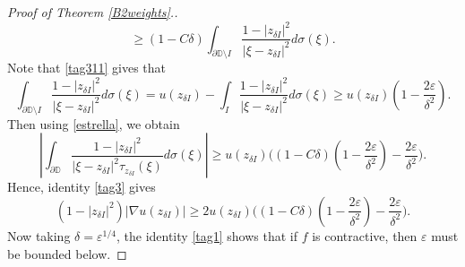 \documentclass[a4paper,12pt]{article}
\theoremstyle{definition}
\numberwithin{equation}{section}
\newcommand{\D}{\mathbb D}
\begin{document}
\begin{proof}[Proof of Theorem \ref{B2weights}.]
$$ \geqslant(1- C\delta) \int_{\partial \D \setminus I} \frac{1- |z_{\delta I}|^{2}}{\left|\xi -z_{\delta I}\right|^{2}} d \sigma(\xi) . 
$$
Note that \eqref{tag311} gives that
$$
\int_{\partial \D \setminus I} \frac{1- |z_{\delta I}|^{2}}{\left|\xi -z_{\delta I}\right|^{2}} d \sigma(\xi) = u\left(z_{\delta I}\right)-\int_{I} \frac{1-\left|z_{\delta I}\right|^{2}}{\left|\xi -z_{\delta I}\right|^{2}} d \sigma (\xi)   \geqslant u\left(z_{\delta I}\right)\left( 1 -\frac{2 \varepsilon}{\delta^{2}} \right) . 
$$
Then using \eqref{estrella}, we obtain  
$$
\left|\int_{\partial \D } \frac{1-|z_{\delta I}|^{2}}{\left|\xi-z_{\delta I}\right|^{2} \tau_{z_{\delta I}} (\xi)} d \sigma (\xi)\right|  \geq   u (z_{\delta I})\bigg( (1 - C \delta ) (1- \frac{2 \varepsilon}{\delta^2}) - \frac{2 \varepsilon}{\delta^2} \bigg). 
$$
Hence, identity \eqref{tag3} gives 
$$
\left(1-\left|z_{\delta I}\right|^{2}\right)\left|\nabla u \left(z_{\delta I}\right)\right| \geqslant 2  u\left(z_{\delta I}\right) \bigg( (1 - C \delta ) (1- \frac{2 \varepsilon}{\delta^2}) - \frac{2 \varepsilon}{\delta^2} \bigg). 
$$
Now taking $\delta = \varepsilon^{1/4}$, the identity \eqref{tag1} shows that if $f$ is contractive, then $\varepsilon$ must be bounded below. 

\medskip





\end{proof}
\end{document}
